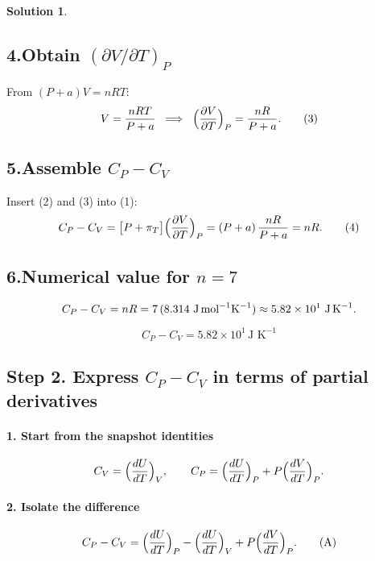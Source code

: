 \documentclass[12pt]{article}
\theoremstyle{definition} %
\newtheorem{solution}{Solution}
\theoremstyle{plain} %
\begin{document}
\begin{solution}
    \subsection*{4.\;Obtain $(\partial V/\partial T)_P$}
    
    From \((P+a)V=nRT\):
    \[
    V = \frac{nRT}{P+a}
       \;\;\Longrightarrow\;\;
    \Bigl(\frac{\partial V}{\partial T}\Bigr)_{P}
       = \frac{nR}{P+a}. \tag{3}
    \]
    
    \subsection*{5.\;Assemble $C_P-C_V$}
    
    Insert (2) and (3) into (1):
    \[
    C_P-C_V
       = \bigl[P+\pi_T\bigr]
         \Bigl(\frac{\partial V}{\partial T}\Bigr)_{P}
       = (P+a)\,\frac{nR}{P+a}
       = nR. \tag{4}
    \]
    
    \subsection*{6.\;Numerical value for \(n=7\)}
    
    \[
    C_P-C_V
       = nR
       = 7\,(8.314\ \text{J\,mol}^{-1}\text{K}^{-1})
       \approx 5.82\times10^{1}\ \text{J\,K}^{-1}.
    \]
    
    \[
    \boxed{C_P-C_V = 5.82\times10^{1}\,\text{J K}^{-1}}
    \]
    \end{solution}
    \subsection*{Step 2.  Express $C_{P}-C_{V}$ in terms of partial derivatives}

\paragraph{1.  Start from the snapshot identities}
\[
C_V = \Bigl(\frac{dU}{dT}\Bigr)_{V},
\qquad
C_P = \Bigl(\frac{dU}{dT}\Bigr)_{P} 
      + P\Bigl(\frac{dV}{dT}\Bigr)_{P}.
\]

\paragraph{2.  Isolate the difference}
\[
C_P-C_V
  = \Bigl(\frac{dU}{dT}\Bigr)_{P}
  - \Bigl(\frac{dU}{dT}\Bigr)_{V}
  + P\Bigl(\frac{dV}{dT}\Bigr)_{P}.
\tag{A}
\]
\end{document}
